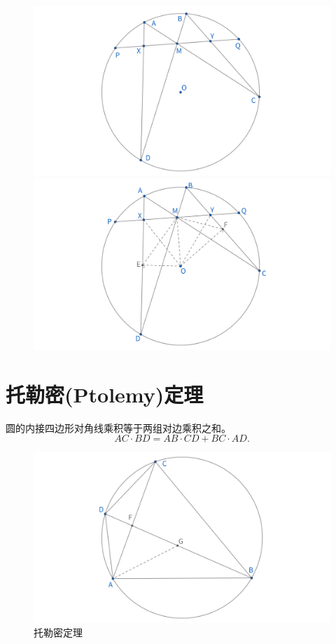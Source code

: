 \begin{figure}[H]
    \centering
    \hfill %
    \begin{minipage}[t]{0.45\textwidth}
    \centering
    \includegraphics[width=\linewidth]{figures/蝴蝶定理.png}
    \end{minipage}
    \hfill %
    \begin{minipage}[t]{0.45\textwidth}
    \centering
    \includegraphics[width=\linewidth]{figures/蝴蝶定理辅助线.png}
    \end{minipage}
\end{figure}



\section{托勒密(Ptolemy)定理}
\begin{theorem}
    圆的内接四边形对角线乘积等于两组对边乘积之和。
    $$AC \cdot BD = AB \cdot CD + BC \cdot AD.$$
\end{theorem}
\begin{figure}[H]
    \centering
    \includegraphics[width=0.7\linewidth]{figures/托勒密定理.png}
    \caption{托勒密定理}
\end{figure}

